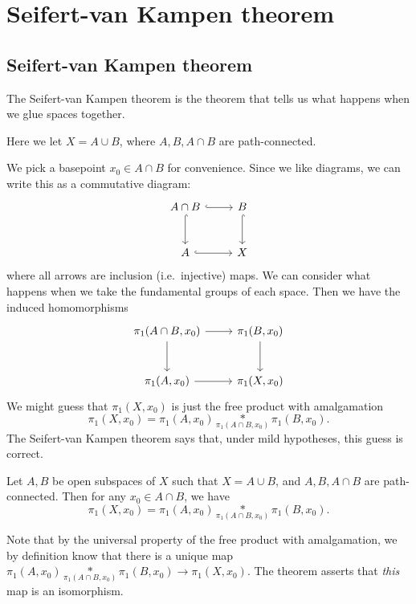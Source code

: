\documentclass[a4paper]{article}
\begin{document}
\section{Seifert-van Kampen theorem}
\subsection{Seifert-van Kampen theorem}
The Seifert-van Kampen theorem is the theorem that tells us what happens when we glue spaces together.

Here we let $X = A\cup B$, where $A, B, A\cap B$ are path-connected.
\begin{center}
\end{center}
We pick a basepoint $x_0 \in A\cap B$ for convenience. Since we like diagrams, we can write this as a commutative diagram:
\[
  \begin{tikzcd}[row sep=large]
    A\cap B \ar [r, hook] \ar[d, hook] & B\ar[d, hook]\\
    A \ar [r, hook] & X
  \end{tikzcd}
\]
where all arrows are inclusion (i.e.\ injective) maps. We can consider what happens when we take the fundamental groups of each space. Then we have the induced homomorphisms
\[
  \begin{tikzcd}[row sep=large]
    \pi_1(A\cap B, x_0) \ar [r] \ar[d] & \pi_1(B, x_0)\ar[d]\\
    \pi_1(A, x_0) \ar [r] & \pi_1(X, x_0)
  \end{tikzcd}
\]
We might guess that $\pi_1(X, x_0)$ is just the free product with amalgamation
\[
  \pi_1(X, x_0) = \pi_1(A, x_0) \underset{\pi_1(A\cap B, x_0)}{*} \pi_1(B, x_0).
\]
The Seifert-van Kampen theorem says that, under mild hypotheses, this guess is correct.

\begin{thm}
  Let $A, B$ be open subspaces of $X$ such that $X = A\cup B$, and $A, B, A\cap B$ are path-connected. Then for any $x_0 \in A\cap B$, we have
  \[
    \pi_1(X, x_0) = \pi_1(A, x_0) \underset{\pi_1(A\cap B, x_0)}{*} \pi_1(B, x_0).
  \]
\end{thm}
Note that by the universal property of the free product with amalgamation, we by definition know that there is a unique map $\pi_1(A, x_0) \underset{\pi_1(A\cap B, x_0)}{*} \pi_1(B, x_0) \to \pi_1(X, x_0)$. The theorem asserts that \emph{this} map is an isomorphism.
\end{document}
